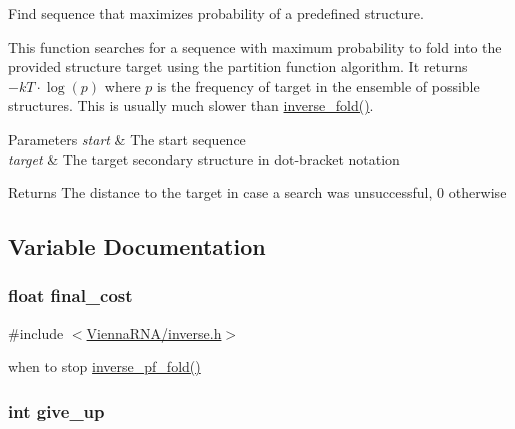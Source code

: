 Find sequence that maximizes probability of a predefined structure. 

This function searches for a sequence with maximum probability to fold into the provided structure \textquotesingle{}target\textquotesingle{} using the partition function algorithm. It returns $-kT \cdot \log(p)$ where $p$ is the frequency of \textquotesingle{}target\textquotesingle{} in the ensemble of possible structures. This is usually much slower than \hyperlink{group__inverse__fold_ga7af026de55d4babad879f2c92559cbbc}{inverse\+\_\+fold()}.


\begin{DoxyParams}{Parameters}
{\em start} & The start sequence \\
\hline
{\em target} & The target secondary structure in dot-\/bracket notation \\
\hline
\end{DoxyParams}
\begin{DoxyReturn}{Returns}
The distance to the target in case a search was unsuccessful, 0 otherwise 
\end{DoxyReturn}


\subsection{Variable Documentation}
\hypertarget{group__inverse__fold_ga7f17d3b169af048d32bb185039a9c09c}{}
\subsubsection[{final\+\_\+cost}]{\setlength{\rightskip}{0pt plus 5cm}float final\+\_\+cost}\label{group__inverse__fold_ga7f17d3b169af048d32bb185039a9c09c}


{\ttfamily \#include $<$\hyperlink{inverse_8h}{Vienna\+R\+N\+A/inverse.\+h}$>$}

when to stop \hyperlink{group__inverse__fold_gaeef52ecbf2a2450ad585a344f9826806}{inverse\+\_\+pf\+\_\+fold()} \hypertarget{group__inverse__fold_ga7ec4ba51f86e1717a1e174264e4a75ce}{}
\subsubsection[{give\+\_\+up}]{\setlength{\rightskip}{0pt plus 5cm}int give\+\_\+up}\label{group__inverse__fold_ga7ec4ba51f86e1717a1e174264e4a75ce}


